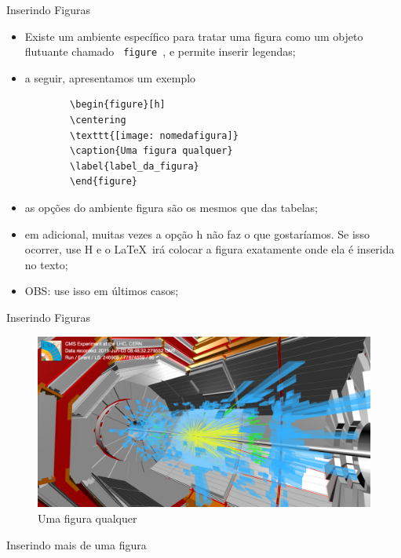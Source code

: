 \documentclass[c]{beamer}
\begin{document}
{		
\begin{frame}[fragile]{\sc Inserindo Figuras}
	\begin{itemize}
				\setlength\itemsep{0.3cm}
		\item Existe um {\color{blue} ambiente específico} para tratar uma {\color{blue} figura} como um {\color{blue} objeto flutuante} chamado \verb| figure |, e permite inserir legendas; 
		\item a seguir, apresentamos um exemplo\\
		\begin{verbatim}
		\begin{figure}[h]
		\centering
		\texttt{[image: nomedafigura]}
		\caption{Uma figura qualquer}
		\label{label_da_figura}
		\end{figure}
		\end{verbatim}
		\item as opções do ambiente figura são os mesmos que das tabelas;
		\item em adicional, muitas vezes a opção h não faz o que gostaríamos. Se isso ocorrer, use H 		e o \LaTeX\  irá colocar a figura exatamente onde ela é inserida no texto;
		\item OBS: use isso em últimos casos;
	\end{itemize}
\end{frame}
		
\begin{frame}[fragile]{\sc Inserindo Figuras}
			\begin{figure}[h]
				\centering
				\includegraphics[width=0.99\linewidth]{images/exemplo_de_figura}
				\caption{Uma figura qualquer}
			\end{figure}
\end{frame}

\begin{frame}[fragile]{Inserindo mais de uma figura}
			

\end{frame}}
\end{document}
